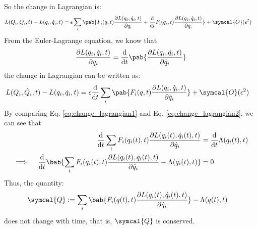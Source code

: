 So the change in Lagrangian is:
\begin{align}
  L(Q_i, \dot{Q}_i, t) - L(q_i, \dot{q}_i, t) & = \epsilon \sum_i \pab{
    F_i(q, t) \pdv{L(q_i, \dot{q}_i, t)}{q_i} + \odv{}{t} F_i(q_i, t) \pdv{L(q_i, \dot{q}_i, t)}{\dot{q}_i}
  } + \symcal{O}(\epsilon^2)
  \label{eq:change_lagrangian2}
\end{align}
From the Euler-Lagrange equation, we know that
\begin{align}
  \pdv{L(q_i, \dot{q}_i, t)}{q_i} = \odv{}{t} \pab{\pdv{L(q_i, \dot{q}_i, t)}{\dot{q}_i}}
\end{align}
the change in Lagrangian can be written as:
\begin{align}
  L(Q_i, \dot{Q}_i, t) - L(q_i, \dot{q}_i, t) & = \epsilon \odv{}{t} \sum_i \pab{
    F_i(q, t) \pdv{L(q_i, \dot{q}_i, t)}{\dot{q}_i}
  } + \symcal{O}(\epsilon^2)
  \label{eq:change_lagrangian2}
\end{align}
By comparing Eq. \eqref{eq:change_lagrangian1} and Eq. \eqref{eq:change_lagrangian2}, we can see that
\begin{align}
  \odv{}{t} \sum_i F_i(q_i(t), t) \pdv{L(q_i(t), \dot{q}_i(t), t)}{\dot{q}_i}
   & = \odv{}{t} \Lambda(q_i(t), t) \\
  \implies \quad \odv{}{t} \bab{
    \sum_i F_i(q_i(t), t) \pdv{L(q_i(t), \dot{q}_i(t), t)}{\dot{q}_i} - \Lambda(q_i(t), t)
  }
   & = 0
\end{align}
Thus, the quantity:
\begin{align}
  \symcal{Q} & := \sum_i \bab{
    F_i(q(t), t) \pdv{L(q_i(t), \dot{q}_i(t), t)}{\dot{q}_i}
  } - \Lambda(q(t), t)
\end{align}
does not change with time, that is, $\symcal{Q}$ is conserved.

